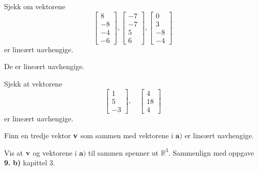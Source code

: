 


\begin{oppgave}
Sjekk om vektorene 
	$$
	\begin{bmatrix}
	8  \\
	-8 \\
	-4 \\
	-6
	\end{bmatrix},
	\begin{bmatrix}
	-7  \\
	-7 \\
	5 \\
	6
	\end{bmatrix},
	\begin{bmatrix}
	0  \\
	3 \\
	-8 \\
	-4
	\end{bmatrix}
	$$ er lineært uavhengige.
\end{oppgave}

\begin{losning}
De er lineært uavhengige.
\end{losning}





\begin{oppgave}

\begin{punkt}
Sjekk at vektorene $$\begin{bmatrix}
1\\
5\\
-3
\end{bmatrix}, \quad \begin{bmatrix}
4\\
18\\
4
\end{bmatrix}$$ er lineært uavhengige.
\end{punkt}

\begin{punkt}
Finn en tredje vektor $\mathbf{v}$ som sammen med vektorene i $\textbf{a)}$ er lineært uavhengige.
\end{punkt}


\begin{punkt}
Vis at $\mathbf{v}$ og vektorene i $\textbf{a)}$ til sammen spenner ut $\mathbb{R}^3$. Sammenlign med oppgave \textbf{9.} \textbf{b)} kapittel 3.
\end{punkt}

\end{oppgave}

